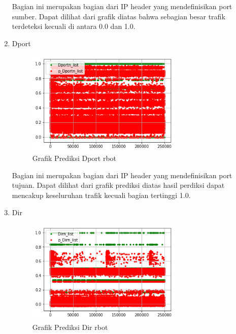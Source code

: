 \documentclass[./skripsi.tex]{subfiles}
\begin{document}
\begin{enumerate}
    \par Bagian ini merupakan bagian dari IP header yang mendefinisikan port sumber. Dapat dilihat dari grafik diatas bahwa sebagian besar trafik terdeteksi kecuali di antara 0.0 dan 1.0.
    
    \item Dport
    \begin{figure}%
        \centering
        \includegraphics[width=0.7\textwidth]{public/assets/img/lstmm_rbot_pred5.png}
        \caption{Grafik Prediksi Dport rbot}
        \label{fig:lstmm_rbot_pred5}
    \end{figure}
    
    \par Bagian ini merupakan bagian dari IP header yang mendefinisikan port tujuan. Dapat dilihat dari grafik prediksi diatas hasil perdiksi dapat mencakup keseluruhan trafik kecuali bagian tertinggi 1.0.
    
    \item Dir
    \begin{figure}%
        \centering
        \includegraphics[width=0.7\textwidth]{public/assets/img/lstmm_rbot_pred6.png}
        \caption{Grafik Prediksi Dir rbot}
        \label{fig:lstmm_rbot_pred6}
    \end{figure}
    

\end{enumerate}
\end{document}
